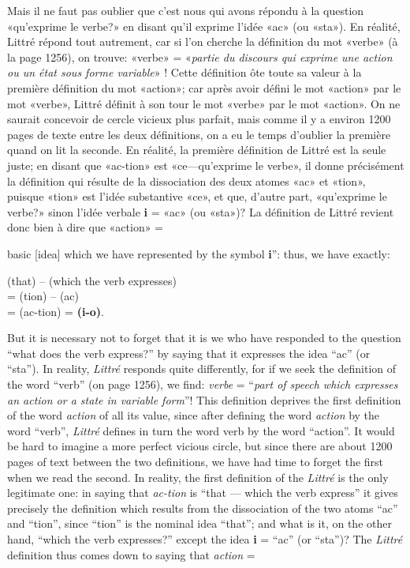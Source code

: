 \begin{sloppypar}
{  Mais il ne faut pas oublier que c’est nous qui avons répondu à la
  question «qu’exprime le verbe?» en disant qu’il exprime l’idée «ac»
  (ou «sta»). En réalité, Littré répond tout autrement, car si l’on
  cherche la définition du mot «verbe» (à la page 1256), on trouve:
  «verbe» = «\emph{partie du discours qui exprime une action ou un
    état sous forme variable}» ! Cette définition ôte toute sa valeur
  à la première définition du mot «action»; car après avoir défini le
  mot «action» par le mot «verbe», Littré définit à son tour le mot
  «verbe» par le mot «action». On ne saurait concevoir de cercle
  vicieux plus parfait, mais comme il y a environ 1200 pages de texte
  entre les deux définitions, on a eu le temps d’oublier la première
  quand on lit la seconde. En réalité, la première définition de
  Littré est la seule juste; en disant que «ac-tion» est
  «ce—qu’exprime le verbe», il donne précisément la définition qui
  résulte de la dissociation des deux atomes «ac» et «tion», puisque
  «tion» est l’idée substantive «ce», et que, d’autre part,
  «qu’exprime le verbe?» sinon l’idée verbale \textbf{i} = «ac» (ou
  «sta»)?  La définition de Littré revient donc bien à dire que
  «action» =

}
%
{\noindent
  basic [idea] which we have represented by the symbol \textbf{i}'':
  thus, we have exactly:

  \noindent
  \begin{center}
    (that) -- (which the verb expresses)\\
    = (tion) -- (ac)\\
    = (ac-tion) = \textbf{(i-o)}.
  \end{center}

  But it is necessary not to forget that it is we who have responded
  to the question ``what does the verb express?'' by saying that it
  expresses the idea ``ac'' (or ``sta''). In reality, \textsl{Littré}
  responds quite differently, for if we seek the definition of the
  word ``verb'' (on page 1256), we find: \emph{verbe} = ``\emph{part of
    speech which expresses an action or a state in variable form}''!
  This definition deprives the first definition of the word \emph{action}
  of all its value, since after defining the word \emph{action} by the
  word ``verb'', \textsl{Littré} defines in turn the word verb by
  the word ``action''. It would be hard to imagine a more perfect
  vicious circle, but since there are about 1200 pages of text between
  the two definitions, we have had time to forget the first when we
  read the second. In reality, the first definition of the
  \textsl{Littré} is the only legitimate one: in saying that
  \emph{ac-tion} is ``that --- which the verb express'' it gives
  precisely the definition which results from the dissociation of the
  two atoms ``ac'' and ``tion'', since ``tion'' is the nominal idea
  ``that''; and what is it, on the other hand, ``which the verb
  expresses?'' except the idea \textbf{i} = ``ac'' (or ``sta'')? The
  \textsl{Littré} definition thus comes down to saying that
  \emph{action} =

}
\end{sloppypar}
